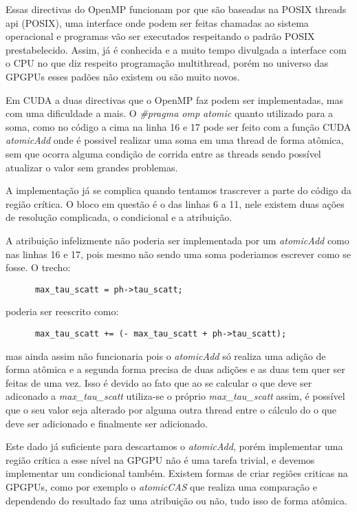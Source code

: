     Essas directivas do OpenMP funcionam por que são baseadas na POSIX threads api (POSIX), uma interface onde podem ser feitas chamadas ao sistema operacional e programas vão ser executados respeitando o padrão POSIX prestabelecido. Assim, já é conhecida e a muito tempo divulgada a interface com o CPU no que diz respeito programação multithread, porém no universo das GPGPUs esses padões não existem ou são muito novos.

    Em CUDA a duas directivas que o OpenMP faz podem ser implementadas, mas com uma dificuldade a mais. O \textit{\#pragma omp atomic} quanto utilizado para a soma, como no código a cima na linha 16 e 17 pode ser feito com a função CUDA \textit{atomicAdd} onde é possivel realizar uma soma em uma thread de forma atômica, sem que ocorra alguma condição de corrida entre as threads sendo possível atualizar o valor sem grandes problemas.

    A implementação já se complica quando tentamos trascrever a parte do código da região crítica. O bloco em questão é o das linhas 6 a 11, nele existem duas ações de resolução complicada, o condicional e a atribuição.

    A atribuição infelizmente não poderia ser implementada por um \textit{atomicAdd} como nas linhas 16 e 17, pois mesmo não sendo uma soma poderiamos escrever como se fosse. O trecho:
    \begin{lstlisting}
      max_tau_scatt = ph->tau_scatt;
    \end{lstlisting}

    poderia ser reescrito como:

    \begin{lstlisting}
      max_tau_scatt += (- max_tau_scatt + ph->tau_scatt);
    \end{lstlisting}

    mas ainda assim não funcionaria pois o \textit{atomicAdd} só realiza uma adição de forma atômica e a segunda forma precisa de duas adições e as duas tem quer ser feitas de uma vez. Isso é devido ao fato que ao se calcular o que deve ser adiconado a \textit{max\_tau\_scatt} utiliza-se o próprio \textit{max\_tau\_scatt} assim, é possível que o seu valor seja alterado por alguma outra thread entre o cálculo do o que deve ser adicionado e finalmente ser adicionado.

    Este dado já suficiente para descartamos o \textit{atomicAdd}, porém implementar uma região crítica a esse nível na GPGPU não é uma tarefa trivial, e devemos implementar um condicional também. Existem formas de criar regiões criticas na GPGPUs, como por exemplo o \textit{atomicCAS} que realiza uma comparação e dependendo do resultado faz uma atribuição ou não, tudo isso de forma atômica.

